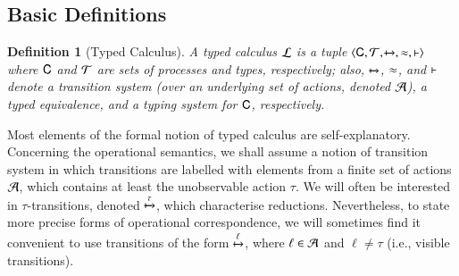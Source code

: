 \documentclass[preprint,11pt]{elsarticle}
\newtheorem{definition}{Definition}[section]
\begin{document}
{\subsection{Basic Definitions}

\begin{definition}[Typed Calculus]\label{d:tcalculus}%
	A \emph{typed calculus} $\mathcal{L}$ is a tuple
	$\langle \mathsf{C}, \cal{T}, \xmapsto{~}, \approx, \vdash \rangle$
	where $\mathsf{C}$ and $\cal{T}$ are sets of processes and types, 
	respectively; also, $\xmapsto{}$, $\approx$, and $\vdash$ 
	denote a transition system (over an underlying set of actions, denoted $\cal{A}$), a typed equivalence,
	and a typing system for $\mathsf{C}$, respectively. 
\end{definition}

%
%
%
%


Most elements of the formal notion of typed calculus are self-explanatory. 
Concerning the operational semantics, we shall assume a notion of transition system in which transitions are labelled with 
elements from a finite set of actions $\cal{A}$, which contains at least the unobservable action $\tau$. 
We will often be interested in $\tau$-transitions, denoted $\xmapsto{\tau}$, which characterise reductions. 
Nevertheless, to state more precise forms of operational correspondence, we 
will sometimes find it convenient to use transitions of 
the form $\xmapsto{\ell}$,
where $\ell \in \cal{A}$ and $\ell \neq \tau$ (i.e., visible transitions). 

}
\end{document}
